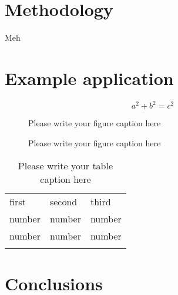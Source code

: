 \documentclass[twocolumn,draft]{svjour3}
\begin{document}
\section{Methodology}

Meh

\section{Example application}


\begin{equation}
a^2+b^2=c^2
\end{equation}

\begin{figure}
\caption{Please write your figure caption here}
\label{fig:1}       %
\end{figure}

\begin{figure*}
\caption{Please write your figure caption here}
\label{fig:2}       %
\end{figure*}

\begin{table}
\caption{Please write your table caption here}
\label{tab:1}       %
\begin{tabular}{lll}
\hline\noalign{\smallskip}
first & second & third  \\
\noalign{\smallskip}\hline\noalign{\smallskip}
number & number & number \\
number & number & number \\
\noalign{\smallskip}\hline
\end{tabular}
\end{table}

\section{Conclusions}
\label{conclusions}
\end{document}
